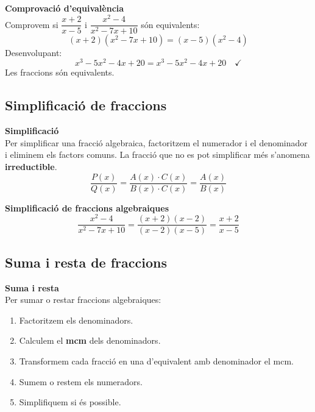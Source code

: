 \documentclass[12pt]{article}
\begin{document}
\begin{exemple}
\textbf{Comprovació d'equivalència}\\
Comprovem si $\dfrac{x+2}{x-5}$ i $\dfrac{x^2-4}{x^2-7x+10}$ són equivalents:
\[
(x+2)(x^2-7x+10) = (x-5)(x^2-4)
\]
Desenvolupant:
\[
x^3-5x^2-4x+20 = x^3-5x^2-4x+20 \quad \checkmark
\]
Les fraccions són equivalents.
\end{exemple}

\subsection{Simplificació de fraccions}

\begin{concept}
\textbf{Simplificació}\\
Per simplificar una fracció algebraica, factoritzem el numerador i el denominador i eliminem els factors comuns. La fracció que no es pot simplificar més s'anomena \textbf{irreductible}.
\[
\dfrac{P(x)}{Q(x)} = \dfrac{A(x) \cdot C(x)}{B(x) \cdot C(x)} = \dfrac{A(x)}{B(x)}
\]
\end{concept}

\begin{exemple}
\textbf{Simplificació de fraccions algebraiques}
\[
\dfrac{x^2-4}{x^2-7x+10} = \dfrac{(x+2)(x-2)}{(x-2)(x-5)} = \dfrac{x+2}{x-5}
\]
\end{exemple}

\subsection{Suma i resta de fraccions}

\begin{concept}
\textbf{Suma i resta}\\
Per sumar o restar fraccions algebraiques:
\begin{enumerate}
    \item Factoritzem els denominadors.
    \item Calculem el \textbf{mcm} dels denominadors.
    \item Transformem cada fracció en una d'equivalent amb denominador el mcm.
    \item Sumem o restem els numeradors.
    \item Simplifiquem si és possible.
\end{enumerate}
\end{concept}
\end{document}
